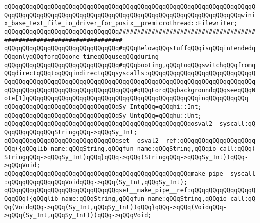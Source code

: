 \verb|qQQqqQQqqQQqqQQqqQQqqQQqqQQqqQQqqQQqqQQqqQQqqQQqqQQqqQQqqQQqqQQqqQQqqQQqqQQqqQQqqQQqqQQqqQQqqQQqqQQqqQQqqQQqqQQqqQQqqQQqqQQqqQQqqQQqqQQqwinix_base_text_file_io_driver_for_posix__premicrothread::Filewriter;|\newline
\newline
\newline
\newline
\verb|qQQqqQQqqQQqqQQqqQQqqQQqqQQqqQQq#######################################################################|\newline
\verb|qQQqqQQqqQQqqQQqqQQqqQQqqQQqqQQq#qQQqBelowqQQqstuffqQQqisqQQqintendedqQQqonlyqQQqforqQQqone-timeqQQquseqQQqduring|\newline
\verb|qQQqqQQqqQQqqQQqqQQqqQQqqQQqqQQq#qQQqbooting,qQQqtoqQQqswitchqQQqfromqQQqdirectqQQqtoqQQqindirectqQQqsyscalls:qQQqqQQqqQQqqQQqqQQqqQQqqQQqqQQqqQQqqQQqqQQqqQQqqQQqqQQqqQQqqQQqqQQqqQQqqQQqqQQqqQQqqQQqqQQqqQQqqQQqqQQqqQQqqQQqqQQqqQQqqQQqqQQqqQQqqQQq#qQQqForqQQqbackgroundqQQqseeqQQqNote[1]qQQqqQQqqQQqqQQqqQQqqQQqqQQqqQQqqQQqqQQqqQQqqQQqinqQQqqQQqqQQq|\newline
\newline
\verb|qQQqqQQqqQQqqQQqqQQqqQQqqQQqqQQqSy_IntqQQq=qQQqhi::Int;|\newline
\verb|qQQqqQQqqQQqqQQqqQQqqQQqqQQqqQQqSy_UntqQQq=qQQqhu::Unt;|\newline
\newline
\verb|qQQqqQQqqQQqqQQqqQQqqQQqqQQqqQQqqQQqqQQqqQQqqQQqqQQqosval2__syscall:qQQqqQQqqQQqqQQqStringqQQq->qQQqSy_Int;|\newline
\verb|qQQqqQQqqQQqqQQqqQQqqQQqqQQqqQQqset__osval2__ref:qQQqqQQqqQQqqQQqqQQqqQQq({qQQqlib_name:qQQqString,qQQqfun_name:qQQqString,qQQqio_call:qQQq(StringqQQq->qQQqSy_Int)qQQq}qQQq->qQQq(StringqQQq->qQQqSy_Int))qQQq->qQQqVoid;|\newline
\newline
\verb|qQQqqQQqqQQqqQQqqQQqqQQqqQQqqQQqqQQqqQQqqQQqqQQqqQQqmake_pipe__syscall:qQQqqQQqqQQqqQQqVoidqQQq->qQQq(Sy_Int,qQQqSy_Int);|\newline
\verb|qQQqqQQqqQQqqQQqqQQqqQQqqQQqqQQqset__make_pipe__ref:qQQqqQQqqQQqqQQqqQQqqQQq({qQQqlib_name:qQQqString,qQQqfun_name:qQQqString,qQQqio_call:qQQq(VoidqQQq->qQQq(Sy_Int,qQQqSy_Int))qQQq}qQQq->qQQq(VoidqQQq->qQQq(Sy_Int,qQQqSy_Int)))qQQq->qQQqVoid;|\newline
\newline
